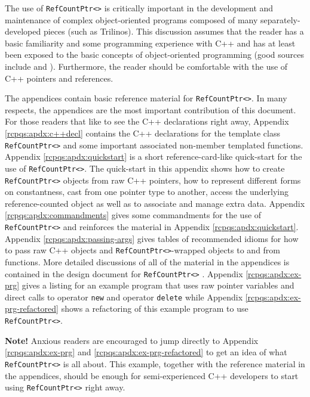 \documentclass[pdf,ps2pdf,11pt]{SANDreport}
\begin{document}
The use of {}\texttt{Ref\-Count\-Ptr<>} is critically important in the
development and maintenance of complex object-oriented programs
composed of many separately-developed pieces (such as Trilinos).  This
discussion assumes that the reader has a basic familiarity and some
programming experience with C++ and has at least been exposed to the
basic concepts of object-oriented programming (good sources include
{}\cite{ref:gama_et_al_1995} and {}\cite{ref:stroustrup_2000}).
Furthermore, the reader should be comfortable with the use of C++
pointers and references.

The appendices contain basic reference material for
{}\texttt{Ref\-Count\-Ptr<>}.  In many respects, the appendices are
the most important contribution of this document.  For those readers
that like to see the C++ declarations right away, Appendix
{}\ref{rcpqs:apdx:c++decl} contains the C++ declarations for the
template class {}\texttt{Ref\-Count\-Ptr<>} and some important
associated non-member templated functions.  Appendix
{}\ref{rcpqs:apdx:quickstart} is a short reference-card-like
quick-start for the use of {}\texttt{Ref\-Count\-Ptr<>}.  The
quick-start in this appendix shows how to create
{}\texttt{Ref\-Count\-Ptr<>} objects from raw C++ pointers, how to
represent different forms on constantness, cast from one pointer type
to another, access the underlying reference-counted object as well as
to associate and manage extra data.  Appendix
{}\ref{rcpqs:apdx:commandments} gives some commandments for the use of
{}\texttt{Ref\-Count\-Ptr<>} and reinforces the material in Appendix
{}\ref{rcpqs:apdx:quickstart}.  Appendix
{}\ref{rcpqs:apdx:passing-args} gives tables of recommended idioms for
how to pass raw C++ objects and {}\texttt{Ref\-Count\-Ptr<>}-wrapped
objects to and from functions.  More detailed discussions of all of
the material in the appendices is contained in the design document for
{}\texttt{Ref\-Count\-Ptr<>} {}\cite{ref:RefCountPtr}.  Appendix
{}\ref{rcpqs:apdx:ex-prg} gives a listing for an example program that
uses raw pointer variables and direct calls to operator {}\texttt{new}
and operator {}\texttt{delete} while Appendix
{}\ref{rcpqs:apdx:ex-prg-refactored} shows a refactoring of this
example program to use {}\texttt{Ref\-Count\-Ptr<>}.

{}\textbf{Note!}  Anxious readers are encouraged to jump directly to
Appendix {}\ref{rcpqs:apdx:ex-prg} and
{}\ref{rcpqs:apdx:ex-prg-refactored} to get an idea of what
{}\texttt{Ref\-Count\-Ptr<>} is all about.  This example, together
with the reference material in the appendices, should be enough for
semi-experienced C++ developers to start using
{}\texttt{Ref\-Count\-Ptr<>} right away.
\end{document}
